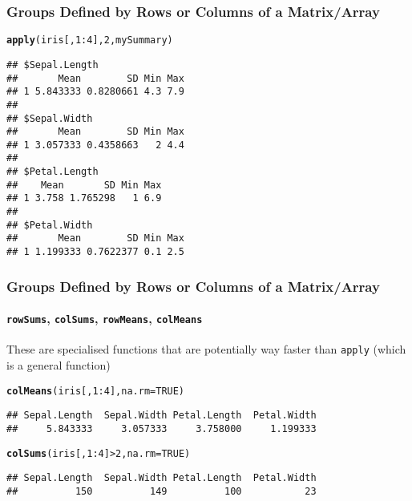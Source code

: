 \documentclass[paper=screen,mathserif]{beamer}\usepackage[]{graphicx}\usepackage[]{color}
\makeatletter
\newcommand{\hlnum}[1]{\textcolor[rgb]{0.686,0.059,0.569}{#1}}%
\newcommand{\hlopt}[1]{\textcolor[rgb]{0,0,0}{#1}}%
\newcommand{\hlstd}[1]{\textcolor[rgb]{0.345,0.345,0.345}{#1}}%
\newcommand{\hlkwc}[1]{\textcolor[rgb]{0.333,0.667,0.333}{#1}}%
\newcommand{\hlkwd}[1]{\textcolor[rgb]{0.737,0.353,0.396}{\textbf{#1}}}%
\newenvironment{kframe}{%
 \def\at@end@of@kframe{}%
 \ifinner\ifhmode%
  \def\at@end@of@kframe{\end{minipage}}%
  \begin{minipage}{\columnwidth}%
 \fi\fi%
 \def\FrameCommand##1{\hskip\@totalleftmargin \hskip-\fboxsep
 \colorbox{shadecolor}{##1}\hskip-\fboxsep
     \hskip-\linewidth \hskip-\@totalleftmargin \hskip\columnwidth}%
 \MakeFramed {\advance\hsize-\width
   \@totalleftmargin\z@ \linewidth\hsize
   \@setminipage}}%
 {\par\unskip\endMakeFramed%
 \at@end@of@kframe}
\newenvironment{knitrout}{}{} %
\newcommand{\ft}[1]{\frametitle{#1}}
\newcommand{\fst}[1]{\framesubtitle{#1}}
\makeatother
\begin{document}
\begin{frame}[fragile]
  \ft{Groups Defined by Rows or Columns of a Matrix/Array}

\begin{knitrout}\scriptsize
{}\color{fgcolor}\begin{kframe}
\begin{alltt}
\hlkwd{apply}\hlstd{(iris[,} \hlnum{1}\hlopt{:}\hlnum{4}\hlstd{],} \hlnum{2}\hlstd{, mySummary)}
\end{alltt}
\begin{verbatim}
## $Sepal.Length
##       Mean        SD Min Max
## 1 5.843333 0.8280661 4.3 7.9
## 
## $Sepal.Width
##       Mean        SD Min Max
## 1 3.057333 0.4358663   2 4.4
## 
## $Petal.Length
##    Mean       SD Min Max
## 1 3.758 1.765298   1 6.9
## 
## $Petal.Width
##       Mean        SD Min Max
## 1 1.199333 0.7622377 0.1 2.5
\end{verbatim}
\end{kframe}
\end{knitrout}

\end{frame}

\begin{frame}[fragile]
  \ft{Groups Defined by Rows or Columns of a Matrix/Array}
  \fst{{\tt rowSums}, {\tt colSums}, {\tt rowMeans}, {\tt colMeans}}
  
  These are specialised functions that are potentially way faster than
  {\tt apply} (which is a general function)

\begin{knitrout}\scriptsize
{}\color{fgcolor}\begin{kframe}
\begin{alltt}
\hlkwd{colMeans}\hlstd{(iris[,} \hlnum{1}\hlopt{:}\hlnum{4}\hlstd{],} \hlkwc{na.rm} \hlstd{=} \hlnum{TRUE}\hlstd{)}
\end{alltt}
\begin{verbatim}
## Sepal.Length  Sepal.Width Petal.Length  Petal.Width 
##     5.843333     3.057333     3.758000     1.199333
\end{verbatim}
\end{kframe}
\end{knitrout}

\begin{knitrout}\scriptsize
{}\color{fgcolor}\begin{kframe}
\begin{alltt}
\hlkwd{colSums}\hlstd{(iris[,} \hlnum{1}\hlopt{:}\hlnum{4}\hlstd{]} \hlopt{>} \hlnum{2}\hlstd{,} \hlkwc{na.rm} \hlstd{=} \hlnum{TRUE}\hlstd{)}
\end{alltt}
\begin{verbatim}
## Sepal.Length  Sepal.Width Petal.Length  Petal.Width 
##          150          149          100           23
\end{verbatim}
\end{kframe}
\end{knitrout}

\end{frame}
\end{document}

